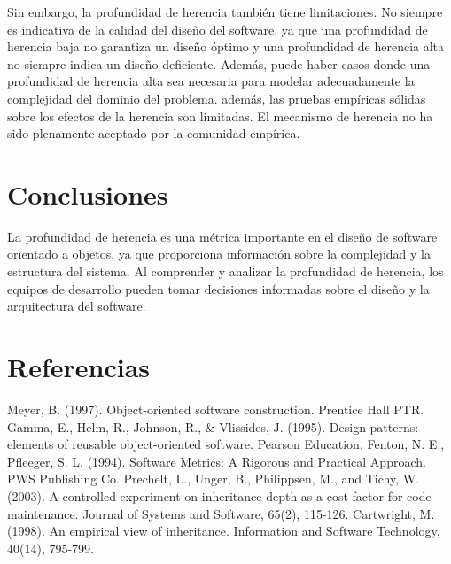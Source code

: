 \documentclass{article}
\begin{document}
Sin embargo, la profundidad de herencia también tiene limitaciones. No siempre es indicativa de la calidad del diseño del software, ya que una profundidad de herencia baja no garantiza un diseño óptimo y una profundidad de herencia alta no siempre indica un diseño deficiente. Además, puede haber casos donde una profundidad de herencia alta sea necesaria para modelar adecuadamente la complejidad del dominio del problema. además, las pruebas empíricas sólidas sobre los efectos de la herencia son limitadas. El mecanismo de herencia no ha sido plenamente aceptado por la comunidad empírica.
\cite{Cartwright1998empirical_inheritance}

\section{Conclusiones}
La profundidad de herencia es una métrica importante en el diseño de software orientado a objetos, ya que proporciona información sobre la complejidad y la estructura del sistema. Al comprender y analizar la profundidad de herencia, los equipos de desarrollo pueden tomar decisiones informadas sobre el diseño y la arquitectura del software.

\section{Referencias}

\begin{thebibliography}{9}
Meyer, B. (1997). Object-oriented software construction. Prentice Hall PTR.
Gamma, E., Helm, R., Johnson, R., \& Vlissides, J. (1995). Design patterns: elements of reusable object-oriented software. Pearson Education.
Fenton, N. E., Pfleeger, S. L. (1994). Software Metrics: A Rigorous and Practical Approach. PWS Publishing Co.
Prechelt, L., Unger, B., Philippsen, M., and Tichy, W. (2003). A controlled experiment on inheritance depth as a cost factor for code maintenance. Journal of Systems and Software, 65(2), 115-126.
Cartwright, M. (1998). An empirical view of inheritance. Information and Software Technology, 40(14), 795-799.
\end{thebibliography}
\end{document}
